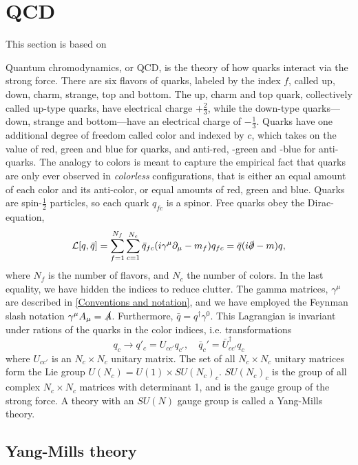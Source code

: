 \section{QCD}
\label{section:QCD}
This section is based on~\cite{Schwartz:QFT,Peskin:IntroQFT,Scherer2002IntroductionTC}

Quantum chromodynamics, or QCD, is the theory of how quarks interact via the strong force.
There are six flavors of quarks, labeled by the index $f$, called up, down, charm, strange, top and bottom.
The up, charm and top quark, collectively called up-type quarks, have electrical charge $+\frac{2}{3}$, while the down-type quarks---down, strange and bottom---have an electrical charge of $-\frac{1}{3}$.
Quarks have one additional degree of freedom called color and indexed by $c$, which takes on the value of red, green and blue for quarks, and anti-red, -green and -blue for anti-quarks.
The analogy to colors is meant to capture the empirical fact that quarks are only ever observed in \emph{colorless} configurations, that is either an equal amount of each color and its anti-color, or equal amounts of red, green and blue.
Quarks are spin-$\frac{1}{2}$ particles, so each quark $q_{fc}$ is a spinor.
Free quarks obey the Dirac-equation,
\begin{equation}
    \mathcal{L}[q, \bar q] = \sum_{f=1}^{N_f} \sum_{c = 1}^{N_c} \bar q_{fc} (i\gamma^\mu \partial_\mu - m_f )q_{fc}
    = \bar q (i\slashed{\partial } - m)q,
\end{equation}
where $N_f$ is the number of flavors, and $N_c$ the number of colors.
In the last equality, we have hidden the indices to reduce clutter.
The gamma matrices, $\gamma^\mu$ are described in \autoref{Conventions and notation}, and we have employed the Feynman slash notation $\gamma^\mu A_\mu = \slashed A$.
Furthermore, $\bar q = q^\dagger \gamma^0$.
This Lagrangian is invariant under rations of the quarks in the color indices, i.e. transformations
\begin{equation}
    q_c \rightarrow q'_c = U_{cc'} q_{c'},
    \quad 
    \bar q_c' = \bar U_{cc'}^\dagger q_c
\end{equation}
where $U_{cc'}$ is an $N_c \times N_c$ unitary matrix.
The set of all $N_c\times N_c$ unitary matrices form the Lie group $U(N_c) = U(1)\times SU(N_c)_c$.
$SU(N_c)_c$ is the group of all complex $N_c\times N_c$ matrices with determinant 1, and is the gauge group of the strong force.
A theory with an $SU(N)$ gauge group is called a Yang-Mills theory.

\subsection*{Yang-Mills theory}


